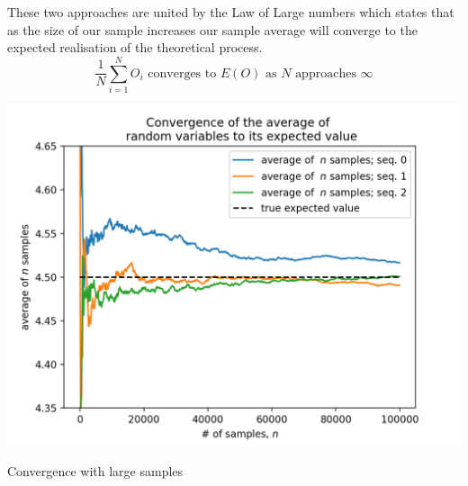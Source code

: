\documentclass{tufte-handout}
\begin{document}
\noindent These two approaches are united by the Law of Large numbers which states that as the size of our sample increases our sample average will converge to the expected realisation of the theoretical process. 
$$  \frac{1}{N} \sum_{i = 1}^{N} O_{i} \text{ converges to }  E(O) \text{ as } N \text{ approaches } \infty $$ 
\begin{marginfigure}
  \includegraphics[width=\linewidth]{../Expectation/Plots/convergence_of_law_of_large_numbers.png}
  \caption{Convergence with large samples}
\end{marginfigure}
\end{document}
